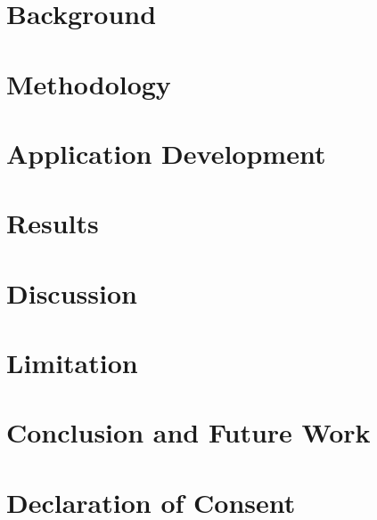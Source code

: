 \documentclass [12pt, oneside] {book}
\begin{document}
\chapter{Background}

\chapter{Methodology}

\chapter{Application Development}

\chapter{Results}

\chapter{Discussion}

\chapter{Limitation}

\chapter{Conclusion and Future Work}





\appendix
\chapter{Declaration of Consent}

\end{document}
